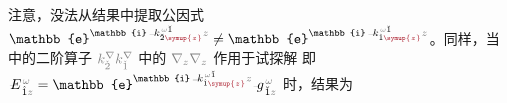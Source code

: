 注意，没法从结果中提取公因式 $\mathbb{e}^{\mathbb{i} \Xint{\begin{smallmatrix} ~ \\ {}^{}_{\mathcolor{gray}{-}} \\ ~ \end{smallmatrix}}{15}{k}_{\breve{2} \textcolor{Maroon}{\symup{z}}}^{\;\! \mathcolor{gray}{\omega} \breve{1}} \mathcolor{gray}{z}} \neq \mathbb{e}^{\mathbb{i} \Xint{\begin{smallmatrix} ~ \\ {}^{}_{\mathcolor{gray}{-}} \\ ~ \end{smallmatrix}}{15}{k}_{\hat{1} \textcolor{Maroon}{\symup{z}}}^{\;\! \mathcolor{gray}{\omega} \breve{1}} \mathcolor{gray}{z}}$。同样，当  中的二阶算子 $\mathcolor{gray}{k^\nabla_{\check{2}}} \mathcolor{gray}{k^\nabla_{\check{1}}}$ 中的 $\mathcolor{gray}{\nabla_z} \mathcolor{gray}{\nabla_z}$ 作用于试探解  即 $
\Xint{\mathcolor{gray}{-}}{25}{E}^{\;\!\mathcolor{gray}{\omega}}_{\;\! \hat{1} \mathcolor{gray}{z}} = \mathbb{e}^{\mathbb{i} \Xint{\begin{smallmatrix} ~ \\ {}^{}_{\mathcolor{gray}{-}} \\ ~ \end{smallmatrix}}{15}{k}_{\hat{1} \textcolor{Maroon}{\symup{z}}}^{\;\! \mathcolor{gray}{\omega} \breve{1}} \mathcolor{gray}{z}} \Xint{{}^{}_{\mathcolor{gray}{-}}}{10}{g}^{\;\!\mathcolor{gray}{\omega}}_{\;\! \breve{1} \mathcolor{gray}{z}}$ 时，结果为

